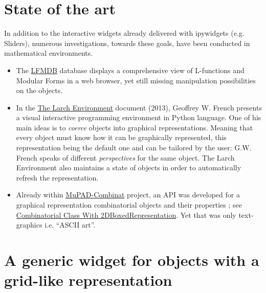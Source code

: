 \documentclass{deliverablereport}
\begin{document}
\section{State of the art}


In addition to the interactive widgets already delivered with ipywidgets (e.g. Sliders), numerous investigations, towards these goals, have been conducted in mathematical environments.

\begin{itemize}
\item The \href{http://www.lmfdb.org/}{LFMDB} database displays a comprehensive view of L-functions and Modular Forms in a web browser, yet still missing manipulation possibilities on the objects.
\item In the \href{https://core.ac.uk/download/pdf/9839511.pdf}{The
  Larch Environment} document (2013), Geoffrey W. French presents a visual
  interactive programming environment in Python language.
  One of his main ideas is to
  \emph{coerce} objects into graphical representations. Meaning that
  every object must know how it can be graphically represented, this
  representation being the default one and can be tailored by the
  user: G.W. French speaks of different \emph{perspectives} for the
  same object. The Larch Environment also maintains a state of objects
  in order to automatically refresh the representation.
\item Already within \href{http://mupad-combinat.sourceforge.net}{MuPAD-Combinat} project, an API was developed for a graphical representation combinatorial objects and their properties ; see \href{http://mupad-combinat.sourceforge.net/doc/en/Cat_Combinat/CombinatorialClassWith2DBoxedRepresentation.html}{Combinatorial Class With 2DBoxedRepresentation}. Yet that was only text-graphics i.e. ``ASCII art''.
\end{itemize}


\section{A generic widget for objects with a grid-like representation}
\label{grid}
\end{document}
